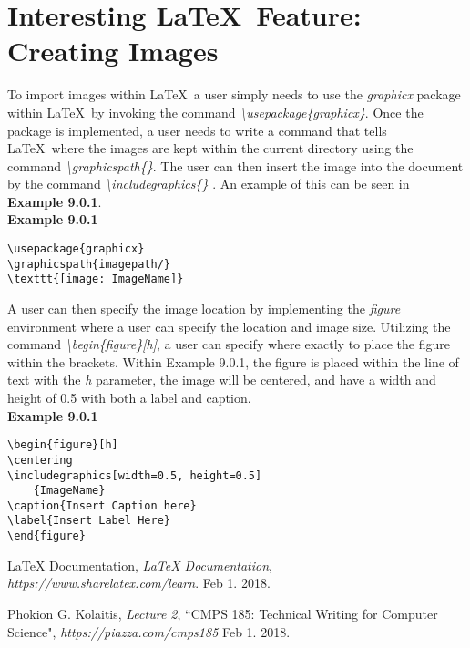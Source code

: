 \documentclass[11pt,twocolumn]{article}
\begin{document}
\section{Interesting \LaTeX\ Feature: Creating Images}
To import images within \LaTeX\, a user simply needs to use the \textit{graphicx} package within \LaTeX\ by invoking the command \textit{\textbackslash usepackage\{graphicx\}}. Once the package is implemented, a user needs to write a command that tells \LaTeX\ where the images are kept within the current directory using the command \textit{\textbackslash graphicspath\{\}}. The user can then insert the image into the document by the command \textit{\textbackslash includegraphics\{\} }. An example of this can be seen in \textbf{Example 9.0.1}.\\
\newpage
\noindent \textbf{Example 9.0.1}
\begin{verbatim}
\usepackage{graphicx}
\graphicspath{imagepath/}
\texttt{[image: ImageName]}
\end{verbatim}

A user can then specify the image location by implementing the \textit{figure} environment where a user can specify the location and image size. Utilizing the command \textit{\textbackslash begin\{figure\}[h]}, a user can specify where exactly to place the figure within the brackets. Within Example 9.0.1, the figure is placed within the line of text with the \textit{h} parameter, the image will be centered, and have a width and height of 0.5 with both a label and caption.\\  

\noindent \textbf{Example 9.0.1}
\begin{verbatim}
\begin{figure}[h]
\centering
\includegraphics[width=0.5, height=0.5]
    {ImageName}
\caption{Insert Caption here}
\label{Insert Label Here}
\end{figure}
\end{verbatim}

\begin{thebibliography}{2}
 LaTeX Documentation, 
\emph{LaTeX Documentation}, \textit{https://www.sharelatex.com/learn}.
Feb 1. 2018.

 Phokion G. Kolaitis, \emph{Lecture 2},
``CMPS 185: Technical Writing for Computer Science",
\textit{https://piazza.com/cmps185}
Feb 1. 2018.
\end{thebibliography}
\end{document}
